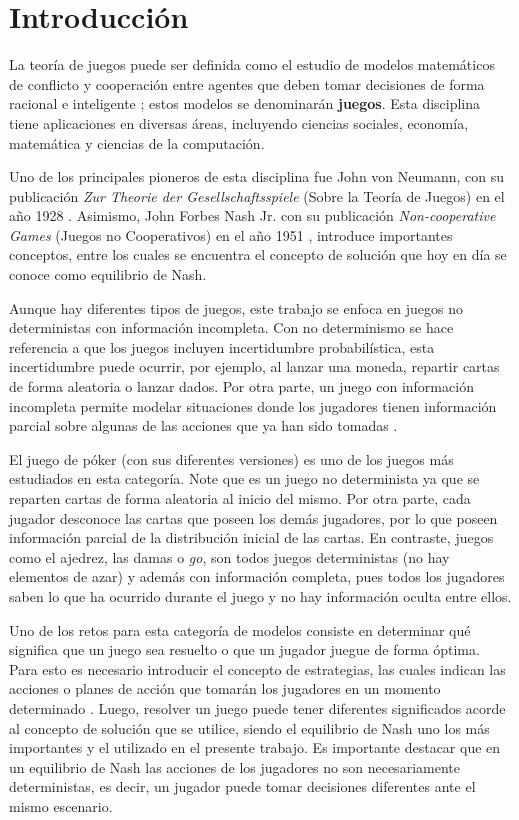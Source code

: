 \chapter*{Introducción}

La teoría de juegos puede ser definida como el estudio de modelos matemáticos de conflicto y cooperación entre agentes que deben tomar decisiones de forma racional e inteligente \cite[p.~1]{bib:game-theory-book}; estos modelos se denominarán \textbf{juegos}. Esta disciplina tiene aplicaciones en diversas áreas, incluyendo ciencias sociales, economía, matemática y ciencias de la computación.

Uno de los principales pioneros de esta disciplina fue John von Neumann, con su publicación \textit{Zur Theorie der Gesellschaftsspiele} (Sobre la Teoría de Juegos) en el año 1928 \cite{bib:von-neumann}. Asimismo, John Forbes Nash Jr. con su publicación \textit{Non-cooperative Games} (Juegos no Cooperativos) en el año 1951 \cite{bib:nash}, introduce importantes conceptos, entre los cuales se encuentra el concepto de solución que hoy en día se conoce como equilibrio de Nash.

Aunque hay diferentes tipos de juegos, este trabajo se enfoca en juegos no deterministas con información incompleta. Con no determinismo se hace referencia a que los juegos incluyen incertidumbre probabilística, esta incertidumbre puede ocurrir, por ejemplo, al lanzar una moneda, repartir cartas de forma aleatoria o lanzar dados. Por otra parte, un juego con información incompleta permite modelar situaciones donde los jugadores tienen información parcial sobre algunas de las acciones que ya han sido tomadas \cite[p.~199]{bib:course-game-theory}.

El juego de póker (con sus diferentes versiones) es uno de los juegos más estudiados en esta categoría. Note que es un juego no determinista ya que se reparten cartas de forma aleatoria al inicio del mismo. Por otra parte, cada jugador desconoce las cartas que poseen los demás jugadores, por lo que poseen información parcial de la distribución inicial de las cartas. En contraste, juegos como el ajedrez, las damas o \textit{go}, son todos juegos deterministas (no hay elementos de azar) y además con información completa, pues todos los jugadores saben lo que ha ocurrido durante el juego y no hay información oculta entre ellos.

Uno de los retos para esta categoría de modelos consiste en determinar qué significa que un juego sea resuelto o que un jugador juegue de forma óptima. Para esto es necesario introducir el concepto de estrategias, las cuales indican las acciones o planes de acción que tomarán los jugadores en un momento determinado \cite[p.~24]{bib:teoria-juegos-es}. Luego, resolver un juego puede tener diferentes significados acorde al concepto de solución que se utilice, siendo el equilibrio de Nash uno los más importantes y el utilizado en el presente trabajo. Es importante destacar que en un equilibrio de Nash las acciones de los jugadores no son necesariamente deterministas, es decir, un jugador puede tomar decisiones diferentes ante el mismo escenario.

